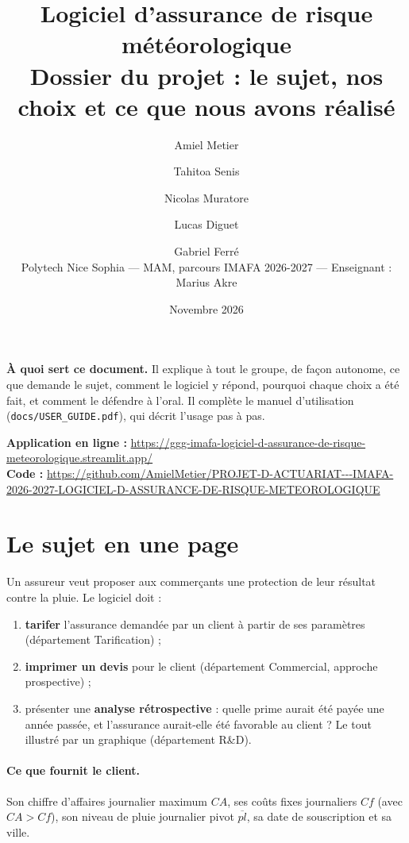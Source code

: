 \documentclass[11pt,a4paper]{article}
\title{\color{bleufonce}\textbf{Logiciel d'assurance de risque météorologique}\\[4pt]
  \large Dossier du projet : le sujet, nos choix et ce que nous avons réalisé}
\author{Amiel Metier \and Tahitoa Senis \and Nicolas Muratore \and Lucas Diguet \and Gabriel Ferré\\[6pt]
  \small Polytech Nice Sophia — MAM, parcours IMAFA 2026-2027 — Enseignant : Marius Akre}
\date{Novembre 2026}
\newcommand{\plbar}{\overline{pl}}
\begin{document}
\maketitle
\thispagestyle{empty}

\begin{encadre}
\textbf{À quoi sert ce document.} Il explique à tout le groupe, de façon autonome, ce que demande le sujet,
comment le logiciel y répond, pourquoi chaque choix a été fait, et comment le défendre à l'oral.
Il complète le manuel d'utilisation (\texttt{docs/USER\_GUIDE.pdf}), qui décrit l'usage pas à pas.

\medskip
\textbf{Application en ligne :} \url{https://ggg-imafa-logiciel-d-assurance-de-risque-meteorologique.streamlit.app/}\\
\textbf{Code :} \url{https://github.com/AmielMetier/PROJET-D-ACTUARIAT---IMAFA-2026-2027-LOGICIEL-D-ASSURANCE-DE-RISQUE-METEOROLOGIQUE}
\end{encadre}

\tableofcontents
\newpage

\section{Le sujet en une page}

Un assureur veut proposer aux commerçants une protection de leur résultat contre la pluie. Le logiciel doit :
\begin{enumerate}
  \item \textbf{tarifer} l'assurance demandée par un client à partir de ses paramètres (département Tarification) ;
  \item \textbf{imprimer un devis} pour le client (département Commercial, approche prospective) ;
  \item présenter une \textbf{analyse rétrospective} : quelle prime aurait été payée une année passée, et l'assurance
        aurait-elle été favorable au client ? Le tout illustré par un graphique (département R\&D).
\end{enumerate}

\paragraph{Ce que fournit le client.} Son chiffre d'affaires journalier maximum $CA$, ses coûts fixes journaliers $Cf$
(avec $CA > Cf$), son niveau de pluie journalier pivot $\plbar$, sa date de souscription et sa ville.
\end{document}

